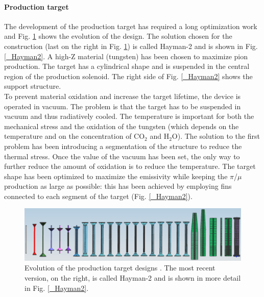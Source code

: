 \documentclass[12pt,a4paper,openright, oneside, titlepage]{book} %
\begin{document}
\paragraph{Production target}
The development of the production target has required a long optimization work and Fig.  \ref{_production_target_history} shows  the evolution of the design.
The solution chosen for the construction (last on the right in Fig.  \ref{_production_target_history}) is called Hayman-2 and is shown in Fig. \ref{_Hayman2}.
A high-Z material (tungsten) has been chosen to maximize pion production. 
The target has a cylindrical shape and is suspended in the central region of the production solenoid.
The right side of Fig. \ref{_Hayman2} shows the support structure.\\
To prevent material oxidation and increase the target lifetime, the device is operated in vacuum. 
The problem is that the target has to be suspended in vacuum and thus radiatively cooled.
The temperature is important for both the mechanical stress and the oxidation of the tungsten (which depends on the temperature and on the concentration of CO$_2$ and H$_2$O).
The solution to the first problem has been introducing a segmentation of the structure to reduce the thermal stress. 
Once the value of the vacuum has been set, the only way to further reduce the amount of oxidation is to reduce the temperature. 
The target shape has been optimized to maximize the emissivity while keeping the $\pi$/$\mu$ production as large as possible: this has been achieved by employing fins connected to each segment of the target (Fig. \ref{_Hayman2}).

\begin{figure}[h!]
\centering
\includegraphics[scale=0.5]{production_target_history}
\caption[Production target history]{Evolution of the production target designs \cite{Pushka_Hayman2}. 
The most recent version, on the right, is called Hayman-2 and is shown in more detail in Fig. \ref{_Hayman2}.}
\label{_production_target_history}
\end{figure}
\end{document}
